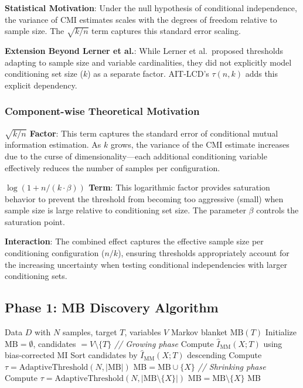 \documentclass{article}
\theoremstyle{plain}
\theoremstyle{definition}
\begin{document}
\textbf{Statistical Motivation}: Under the null hypothesis of conditional independence, the variance of CMI estimates scales with the degrees of freedom relative to sample size. The $\sqrt{k/n}$ term captures this standard error scaling.

\textbf{Extension Beyond Lerner et al.}: While Lerner et al.~proposed thresholds adapting to sample size and variable cardinalities, they did not explicitly model conditioning set size ($k$) as a separate factor. AIT-LCD's $\tau(n,k)$ adds this explicit dependency.

\subsubsection{Component-wise Theoretical Motivation}

\textbf{$\sqrt{k/n}$ Factor}: This term captures the standard error of conditional mutual information estimation. As $k$ grows, the variance of the CMI estimate increases due to the curse of dimensionality---each additional conditioning variable effectively reduces the number of samples per configuration.

\textbf{$\log(1 + n/(k\cdot\beta))$ Term}: This logarithmic factor provides saturation behavior to prevent the threshold from becoming too aggressive (small) when sample size is large relative to conditioning set size. The parameter $\beta$ controls the saturation point.

\textbf{Interaction}: The combined effect captures the effective sample size per conditioning configuration ($n/k$), ensuring thresholds appropriately account for the increasing uncertainty when testing conditional independencies with larger conditioning sets.

\subsection{Phase 1: MB Discovery Algorithm}

\begin{algorithm}[t]
\caption{AIT-MB: Adaptive Information-Theoretic Markov Blanket}
\label{alg:ait-mb}
\begin{algorithmic}[1]
\Require Data $D$ with $N$ samples, target $T$, variables $V$
\Ensure Markov blanket $\text{MB}(T)$
\State Initialize $\text{MB} = \emptyset$, candidates $= V \setminus \{T\}$
\State \textit{// Growing phase}
    \State Compute $\hat{I}_{\text{MM}}(X; T)$ using bias-corrected MI
\EndFor
\State Sort candidates by $\hat{I}_{\text{MM}}(X; T)$ descending
    \State Compute $\tau = \text{AdaptiveThreshold}(N, |\text{MB}|)$
        \State $\text{MB} = \text{MB} \cup \{X\}$
    \EndIf
\EndFor
\State \textit{// Shrinking phase}
    \State Compute $\tau = \text{AdaptiveThreshold}(N, |\text{MB} \setminus \{X\}|)$
        \State $\text{MB} = \text{MB} \setminus \{X\}$
    \EndIf
\EndFor
\State \Return MB
\end{algorithmic}
\end{algorithm}
\end{document}
